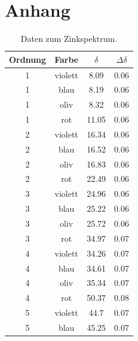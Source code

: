 \documentclass[]{article}
\begin{document}
\section{Anhang}

\begin{table}[H]
\centering
\begin{tabular}{|c|c|c|c|}
\hline
Ordnung & Farbe & $\delta$ & $\Delta\delta$ \\ \hline\hline
1 & violett & 8.09 & 0.06 \\ \hline
1 & blau & 8.19 & 0.06 \\ \hline
1 & oliv & 8.32 & 0.06 \\ \hline
1 & rot & 11.05 & 0.06 \\ \hline
2 & violett & 16.34 & 0.06 \\ \hline
2 & blau & 16.52 & 0.06 \\ \hline
2 & oliv & 16.83 & 0.06 \\ \hline
2 & rot & 22.49 & 0.06 \\ \hline
3 & violett & 24.96 & 0.06 \\ \hline
3 & blau & 25.22 & 0.06 \\ \hline
3 & oliv & 25.72 & 0.06 \\ \hline
3 & rot & 34.97 & 0.07 \\ \hline
4 & violett & 34.26 & 0.07 \\ \hline
4 & blau & 34.61 & 0.07 \\ \hline
4 & oliv & 35.34 & 0.07 \\ \hline
4 & rot & 50.37 & 0.08 \\ \hline
5 & violett & 44.7 & 0.07 \\ \hline
5 & blau & 45.25 & 0.07 \\ \hline
\hline
\end{tabular}
\caption{Daten zum Zinkspektrum.\label{Zn Data}}
\end{table}
\end{document}
